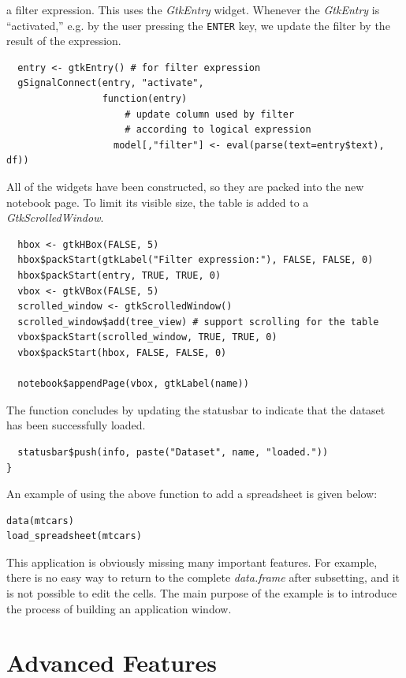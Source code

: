 \documentclass[article]{jss}
\begin{document}
a filter expression. This uses the \emph{GtkEntry} widget. Whenever the
\emph{GtkEntry} is ``activated,'' e.g. by the user pressing the \texttt{ENTER}
key, we update the filter by the result of the 
expression.
\begin{verbatim}
  entry <- gtkEntry() # for filter expression
  gSignalConnect(entry, "activate", 
                 function(entry)
                     # update column used by filter 
                     # according to logical expression
                   model[,"filter"] <- eval(parse(text=entry$text), df))
\end{verbatim}
All of the widgets have been constructed, so they are packed into the new notebook page.
To limit its visible size, the table is added to a \emph{GtkScrolledWindow}.
\begin{verbatim}
  hbox <- gtkHBox(FALSE, 5)
  hbox$packStart(gtkLabel("Filter expression:"), FALSE, FALSE, 0)
  hbox$packStart(entry, TRUE, TRUE, 0)
  vbox <- gtkVBox(FALSE, 5)
  scrolled_window <- gtkScrolledWindow()
  scrolled_window$add(tree_view) # support scrolling for the table
  vbox$packStart(scrolled_window, TRUE, TRUE, 0)
  vbox$packStart(hbox, FALSE, FALSE, 0)
  
  notebook$appendPage(vbox, gtkLabel(name))
\end{verbatim}
The function concludes by updating the statusbar to indicate that the dataset
has been successfully loaded.
\begin{verbatim}
  statusbar$push(info, paste("Dataset", name, "loaded."))
}
\end{verbatim}

An example of using the above function to add a spreadsheet is given below:
\begin{verbatim}
data(mtcars)
load_spreadsheet(mtcars)
\end{verbatim}

This application is obviously missing many important features. For example, 
there is no easy way to return to the complete \emph{data.frame} after subsetting, and
it is not possible to edit the cells. The main purpose of the example is to
introduce the process of building an application window.

\section{Advanced Features}
\end{document}

